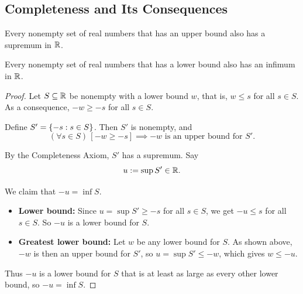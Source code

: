 \subsection{Completeness and Its Consequences}
\begin{axiom}
    Every nonempty set of real numbers that has an upper bound also has a supremum in $\mathbb{R}$.
\end{axiom}

\begin{corollary}\label{cor:inf-existence}
    Every nonempty set of real numbers that has a lower bound also has an infimum in $\mathbb{R}$.
\end{corollary}
\begin{proof}
    Let $S \subseteq \mathbb{R}$ be nonempty with a lower bound $w$, that is, $w \leq s$ for all $s \in S$. As a consequence, $-w \geq -s$ for all $s \in S$.

    Define $S' = \left\{-s : s \in S\right\}$. Then $S'$ is nonempty, and
    \begin{equation*}
        (\forall s \in S)\,[-w \geq -s] \implies -w \text{ is an upper bound for } S'.
    \end{equation*}

    By the Completeness Axiom, $S'$ has a supremum. Say
    \begin{equation*}
        u := \sup S' \in \mathbb{R}.
    \end{equation*}

    We claim that $-u = \inf S$.
    \begin{itemize}
        \item \textbf{Lower bound:} Since $u = \sup S' \geq -s$ for all $s \in S$, we get $-u \leq s$ for all $s \in S$. So $-u$ is a lower bound for $S$.
        \item \textbf{Greatest lower bound:} Let $w$ be any lower bound for $S$. As shown above, $-w$ is then an upper bound for $S'$, so $u = \sup S' \leq -w$, which gives $w \leq -u$.
    \end{itemize}
    Thus $-u$ is a lower bound for $S$ that is at least as large as every other lower bound, so $-u = \inf S$.
\end{proof}


